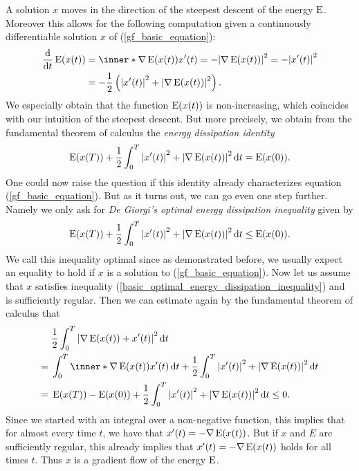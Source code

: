A solution $ x $ moves in the 
direction of the steepest descent of the energy $ \operatorname{E} $. Moreover this 
allows for the following computation given a continuously differentiable 
solution $ x $ of (\ref{gf_basic_equation}):
\begin{align*}
	\dv{ t } \energy ( x ( t ) ) 
	& =
	\inner*{ \nabla \energy ( x ( t ) ) }{ x ' ( t ) }
	=
	- \abs{ \nabla \energy ( x ( t ) ) }^{ 2 }
	=
	- \abs{ x' ( t ) }^{ 2 }
	\\
	& =
	- \frac{ 1 }{ 2 }
	\left(
		\abs{ x'( t ) }^{ 2 }
		+
		\abs{ \nabla \energy ( x ( t ) ) }^{ 2 }
	\right).
\end{align*}
We especially obtain that the function $ \operatorname{E} ( x ( t ) ) $ is 
non-increasing, which coincides with our intuition of the steepest descent. But 
more precisely, we obtain from the 
fundamental theorem of calculus the \emph{energy dissipation identity}
\begin{equation}
	\label{basic_energy_dissipation_identity}
	\operatorname{E} ( x ( T ) )
	+
	\frac{ 1 }{ 2 }
	\int_{ 0 }^{ T }
		\abs{ x' ( t ) }^{ 2 }
		+
		\abs{ \nabla \operatorname{E} ( x ( t ) ) }^{ 2 }
	\dd{ t }
	= 
	\operatorname{E} ( x ( 0 ) ).
\end{equation}
One could now raise the question if this identity already characterizes 
equation (\ref{gf_basic_equation}). 
But as it turns out, we can go even one step further. Namely we only ask for 
\emph{De Giorgi's optimal energy dissipation inequality} given by
\begin{equation}
	\label{basic_optimal_energy_dissipation_inequality}
	\operatorname{E} ( x ( T ) )
	+
	\frac{ 1 }{ 2 }
	\int_{ 0 }^{ T }
		\abs{ x' ( t ) }^{ 2 }
		+
		\abs{ \nabla \operatorname{E} ( x ( t ) ) }^{ 2 }
	\dd{ t }
	\leq
	\operatorname{E} ( x ( 0 ) ).
\end{equation}
We call this inequality optimal since as demonstrated before, we usually expect 
an equality to hold if $ x $ is a solution to (\ref{gf_basic_equation}).
Now let us assume that $ x $ satisfies inequality
(\ref{basic_optimal_energy_dissipation_inequality}) and is sufficiently regular.
Then we can estimate again by the fundamental theorem of calculus that
\begin{align*}
	& \frac{ 1 }{ 2 }
	\int_{ 0 }^{ T }
		\abs{
			\nabla \energy ( x ( t ) )
			+
			x' ( t ) 
		}^{ 2 }
	\dd{ t }
	\\
	={} &
	\int_{ 0 }^{ T }
		\inner*{ \nabla \energy ( x ( t ) ) }{ x' ( t ) }
	\dd{ t }
	+
	\frac{ 1 }{ 2 }
	\int_{ 0 }^{ T }
		\abs{ x' ( t ) }^{ 2 }
		+
		\abs{ \nabla \energy ( x ( t ) ) }^{ 2 }
	\dd{ t }
	\\
	={} &
	\energy ( x ( T ) ) - \energy ( x ( 0 ) ) 
	+
	\frac{ 1 }{ 2 }
	\int_{ 0 }^{ T }
		\abs{ x' ( t ) }^{ 2 }
		+
		\abs{ \nabla \energy ( x ( t ) ) }^{ 2 }
	\dd{ t }
	\leq 0.
\end{align*}
Since we started with an integral over a non-negative function, this implies 
that for almost every time $ t $, we have that $ x' ( t ) = - \nabla \operatorname{E} ( 
x ( t ) ) $. But if $ x $ and $ E $ are sufficiently regular, this already 
implies that $ x' ( t ) = - \nabla \operatorname{E} ( x ( t ) ) $ holds for all times $ 
t 
$.
Thus $ x $ is a gradient flow of 
the energy $ \operatorname{E} $.

